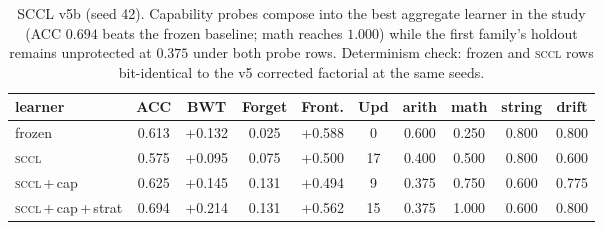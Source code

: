 \documentclass[10pt,conference]{IEEEtran}
\begin{document}
\begin{table}[t]
\centering
\small
\caption{SCCL v5b (seed 42). Capability probes compose into the best aggregate learner in the study (ACC $0.694$ beats the frozen baseline; math reaches $1.000$) while the first family's holdout remains unprotected at $0.375$ under both probe rows. Determinism check: frozen and \textsc{sccl} rows bit-identical to the v5 corrected factorial at the same seeds.}
\label{tab:v5b}
\begin{tabular}{lccccccccc}
\toprule
learner & ACC & BWT & Forget & Front. & Upd & arith & math & string & drift \\
\midrule
frozen              & 0.613 & +0.132 & 0.025 & +0.588 & 0  & 0.600 & 0.250 & 0.800 & 0.800 \\
\textsc{sccl}       & 0.575 & +0.095 & 0.075 & +0.500 & 17 & 0.400 & 0.500 & 0.800 & 0.600 \\
\textsc{sccl}\,+\,cap              & 0.625 & +0.145 & 0.131 & +0.494 & 9  & 0.375 & 0.750 & 0.600 & 0.775 \\
\textsc{sccl}\,+\,cap\,+\,strat    & 0.694 & +0.214 & 0.131 & +0.562 & 15 & 0.375 & 1.000 & 0.600 & 0.800 \\
\bottomrule
\end{tabular}
\end{table}
\end{document}
